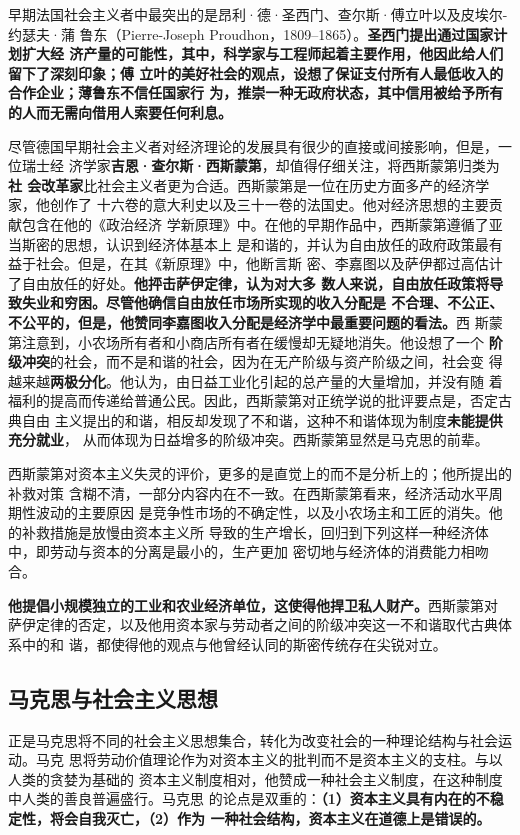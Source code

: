 早期法国社会主义者中最突出的是昂利·德·圣西门、查尔斯·傅立叶以及皮埃尔-约瑟夫·蒲
鲁东（Pierre-Joseph Proudhon，1809--1865）。\textbf{圣西门提出通过国家计划扩大经
济产量的可能性，其中，科学家与工程师起着主要作用，他因此给人们留下了深刻印象；傅
立叶的美好社会的观点，设想了保证支付所有人最低收入的合作企业；薄鲁东不信任国家行
为，推崇一种无政府状态，其中信用被给予所有的人而无需向借用人索要任何利息。}

尽管德国早期社会主义者对经济理论的发展具有很少的直接或间接影响，但是，一位瑞士经
济学家\textbf{吉恩·查尔斯·西斯蒙第}，却值得仔细关注，将西斯蒙第归类为\textbf{社
会改革家}比社会主义者更为合适。西斯蒙第是一位在历史方面多产的经济学家，他创作了
十六卷的意大利史以及三十一卷的法国史。他对经济思想的主要贡献包含在他的《政治经济
学新原理》中。在他的早期作品中，西斯蒙第遵循了亚当斯密的思想，认识到经济体基本上
是和谐的，并认为自由放任的政府政策最有益于社会。但是，在其《新原理》中，他断言斯
密、李嘉图以及萨伊都过高估计了自由放任的好处。\textbf{他抨击萨伊定律，认为对大多
数人来说，自由放任政策将导致失业和穷困。尽管他确信自由放任市场所实现的收入分配是
不合理、不公正、不公平的，但是，他赞同李嘉图收入分配是经济学中最重要问题的看法。}西
斯蒙第注意到，小农场所有者和小商店所有者在缓慢却无疑地消失。他设想了一个
\textbf{阶级冲突}的社会，而不是和谐的社会，因为在无产阶级与资产阶级之间，社会变
得越来越\textbf{两极分化}。他认为，由日益工业化引起的总产量的大量增加，并没有随
着福利的提高而传递给普通公民。因此，西斯蒙第对正统学说的批评要点是，否定古典自由
主义提出的和谐，相反却发现了不和谐，这种不和谐体现为制度\textbf{未能提供充分就业}，
从而体现为日益增多的阶级冲突。西斯蒙第显然是马克思的前辈。

西斯蒙第对资本主义失灵的评价，更多的是直觉上的而不是分析上的；他所提出的补救对策
含糊不清，一部分内容内在不一致。在西斯蒙第看来，经济活动水平周期性波动的主要原因
是竞争性市场的不确定性，以及小农场主和工匠的消失。他的补救措施是放慢由资本主义所
导致的生产增长，回归到下列这样一种经济体中，即劳动与资本的分离是最小的，生产更加
密切地与经济体的消费能力相吻合。

\textbf{他提倡小规模独立的工业和农业经济单位，这使得他捍卫私人财产。}西斯蒙第对
萨伊定律的否定，以及他用资本家与劳动者之间的阶级冲突这一不和谐取代古典体系中的和
谐，都使得他的观点与他曾经认同的斯密传统存在尖锐对立。

\subsection{马克思与社会主义思想}

正是马克思将不同的社会主义思想集合，转化为改变社会的一种理论结构与社会运动。马克
思将劳动价值理论作为对资本主义的批判而不是资本主义的支柱。与以人类的贪婪为基础的
资本主义制度相对，他赞成一种社会主义制度，在这种制度中人类的善良普遍盛行。马克思
的论点是双重的：\textbf{（1）资本主义具有内在的不稳定性，将会自我灭亡，（2）作为
一种社会结构，资本主义在道德上是错误的。}


